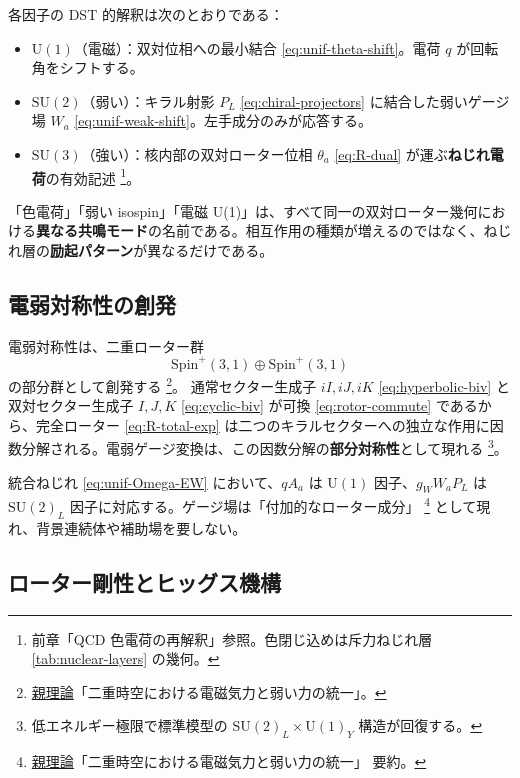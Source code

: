 \documentclass[dvipdfmx,a4paper,oneside]{jsbook}
\numberwithin{equation}{chapter}
\begin{document}
各因子の DST 的解釈は次のとおりである：
\begin{itemize}[leftmargin=2em]
  \item \(\mathrm{U}(1)\)（電磁）：双対位相への最小結合 \eqref{eq:unif-theta-shift}。電荷 \(q\) が回転角をシフトする。
  \item \(\mathrm{SU}(2)\)（弱い）：キラル射影 \(P_L\) \eqref{eq:chiral-projectors} に結合した弱いゲージ場 \(W_a\) \eqref{eq:unif-weak-shift}。左手成分のみが応答する。
  \item \(\mathrm{SU}(3)\)（強い）：核内部の双対ローター位相 \(\theta_a\) \eqref{eq:R-dual} が運ぶ\textbf{ねじれ電荷}の有効記述 \footnote{前章「QCD 色電荷の再解釈」参照。色閉じ込めは斥力ねじれ層 \eqref{tab:nuclear-layers} の幾何。}。
\end{itemize}

「色電荷」「弱い isospin」「電磁 U(1)」は、すべて同一の双対ローター幾何における\textbf{異なる共鳴モード}の名前である。相互作用の種類が増えるのではなく、ねじれ層の\textbf{励起パターン}が異なるだけである。

\subsection{電弱対称性の創発}

電弱対称性は、二重ローター群
\begin{equation}
  \mathrm{Spin}^+(3,1) \oplus \mathrm{Spin}^+(3,1)
  \label{eq:unif-spin-double}
\end{equation}
の部分群として創発する \footnote{\hyperref[sec:sister-manuscripts]{親理論}「二重時空における電磁気力と弱い力の統一」。}。
通常セクター生成子 \(iI, iJ, iK\) \eqref{eq:hyperbolic-biv} と双対セクター生成子 \(I, J, K\) \eqref{eq:cyclic-biv} が可換 \eqref{eq:rotor-commute} であるから、完全ローター \eqref{eq:R-total-exp} は二つのキラルセクターへの独立な作用に因数分解される。電弱ゲージ変換は、この因数分解の\textbf{部分対称性}として現れる \footnote{低エネルギー極限で標準模型の \(\mathrm{SU}(2)_L \times \mathrm{U}(1)_Y\) 構造が回復する。}。

統合ねじれ \eqref{eq:unif-Omega-EW} において、\(q A_a\) は \(\mathrm{U}(1)\) 因子、\(g_W W_a P_L\) は \(\mathrm{SU}(2)_L\) 因子に対応する。ゲージ場は「付加的なローター成分」 \footnote{\hyperref[sec:sister-manuscripts]{親理論}「二重時空における電磁気力と弱い力の統一」 要約。} として現れ、背景連続体や補助場を要しない。

\subsection{ローター剛性とヒッグス機構}
\end{document}
